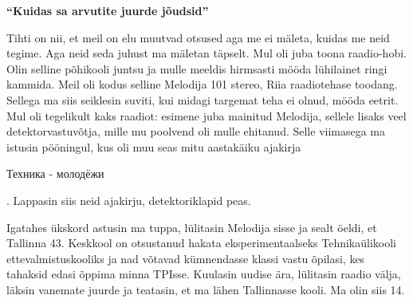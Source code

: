 
\textbf{\enquote{Kuidas sa arvutite juurde jõudsid}}

Tihti on nii, et meil on elu muutvad otsused aga me ei mäleta, kuidas me neid tegime. Aga neid seda juhust ma mäletan täpselt. Mul oli juba toona raadio-hobi. Olin selline põhikooli juntsu ja mulle meeldis hirmsasti mööda lühilainet ringi kammida. Meil oli kodus selline Melodija 101 stereo, Riia raadiotehase toodang. Sellega ma siis seiklesin suviti, kui midagi targemat teha ei olnud, mööda eetrit. Mul oli tegelikult kaks raadiot: esimene juba mainitud Melodija, sellele lisaks veel detektorvastuvõtja, mille mu poolvend oli mulle ehitanud. Selle viimasega ma istusin pööningul, kus oli muu seas mitu aastakäiku ajakirja \begin{russian}Техника - молодёжи\end{russian}. Lappasin siis neid ajakirju, detektoriklapid peas. 

Igatahes ükskord astusin ma tuppa, lülitasin Melodija sisse ja sealt öeldi, et Tallinna 43. Keskkool on otsustanud hakata eksperimentaalseks Tehnikaülikooli ettevalmistuskooliks ja nad võtavad kümnendasse klassi vastu õpilasi, kes tahaksid edasi õppima minna TPIsse. Kuulasin uudise ära, lülitasin raadio välja, läksin vanemate juurde ja teatasin, et ma lähen Tallinnasse kooli. Ma olin siis 14.
